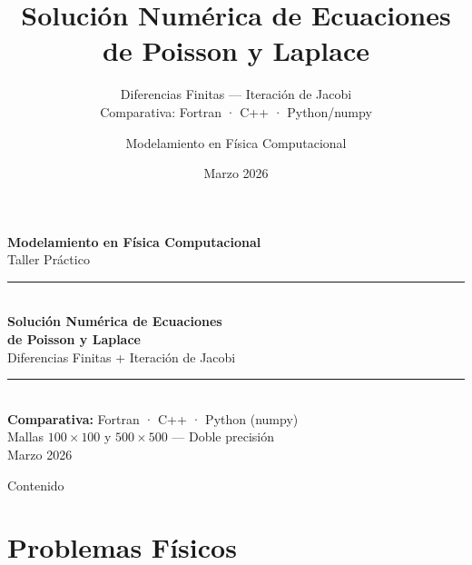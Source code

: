 \documentclass[aspectratio=169, 11pt]{beamer}
\title[FDM Jacobi — Poisson \& Laplace]{%
  Solución Numérica de Ecuaciones\\[0.2cm]
  de Poisson y Laplace}
\subtitle{Diferencias Finitas — Iteración de Jacobi\\
  \small Comparativa: Fortran · C++ · Python/numpy}
\author[Modelamiento FC]{Modelamiento en Física Computacional}
\date{Marzo 2026}
\begin{document}

{
\begin{frame}[plain]
  \vspace{0.8cm}
  \begin{center}
    {\color{white}\Large\textbf{Modelamiento en Física Computacional}}\\[0.2cm]
    {\color{azulmed!60!white}\normalsize Taller Práctico}\\[0.6cm]
    \textcolor{white}{\rule{0.8\linewidth}{0.8pt}}\\[0.5cm]
    {\color{white}\LARGE\textbf{Solución Numérica de Ecuaciones}}\\[0.2cm]
    {\color{white}\LARGE\textbf{de Poisson y Laplace}}\\[0.2cm]
    {\color{azulmed!70!white}\normalsize Diferencias Finitas + Iteración de Jacobi}\\[0.3cm]
    \textcolor{white}{\rule{0.8\linewidth}{0.8pt}}\\[0.5cm]
    {\color{white}\normalsize\textbf{Comparativa:} Fortran · C++ · Python (numpy)}\\[0.2cm]
    {\color{white}\normalsize Mallas $100\times100$ y $500\times500$ — Doble precisión}\\[0.6cm]
    {\color{azulmed!70!white}\small Marzo 2026}
  \end{center}
\end{frame}
}

\begin{frame}{Contenido}
  \tableofcontents
\end{frame}

\section{Problemas Físicos}
\end{document}
